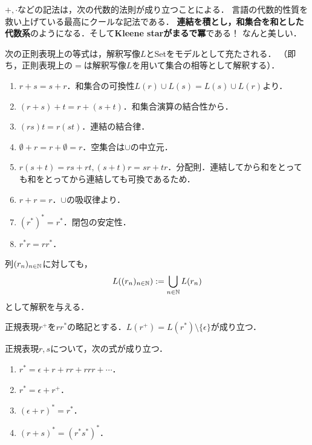 \documentclass[uplatex, dvipdfmx]{jsreport}
\begin{document}
\begin{tcolorbox}[colframe=ForestGreen, colback=ForestGreen!10!white, breakable,
    title=正則表現があからさまにするもの]
    $+,\cdot$などの記法は，次の代数的法則が成り立つことによる．
    言語の代数的性質を救い上げている最高にクールな記法である．
    \textbf{連結を積とし，和集合を和とした代数系}のようになる．そして\textbf{Kleene starがまるで冪}である！
    なんと美しい．
\end{tcolorbox}

\begin{lemma}
    次の正則表現上の等式は，解釈写像$L$とSetをモデルとして充たされる．
    （即ち，正則表現上の$=$は解釈写像$L$を用いて集合の相等として解釈する）．
    \begin{enumerate}
        \item $r+s=s+r$．和集合の可換性$L(r)\cup L(s)=L(s)\cup L(r)$より．
        \item $(r+s)+t=r+(s+t)$．和集合演算の結合性から．
        \item $(rs)t=r(st)$．連結の結合律．
        \item $\emptyset+r=r+\emptyset=r$．空集合は$\cup$の中立元．
        \item $r(s+t)=rs+rt, (s+t)r=sr+tr$．分配則．連結してから和をとっても和をとってから連結しても可換であるため．
        \item $r+r=r$．$\cup$の吸収律より．
        \item $(r^*)^*=r^*$．閉包の安定性．
        \item $r^*r=rr^*$．
    \end{enumerate}
\end{lemma}

\begin{definition}
    列$(r_n)_{n\in\mathbb{N}}$に対しても，
    \[ L((r_n)_{n\in\mathbb{N}}):=\bigcup_{n\in\mathbb{N}}L(r_n) \]
    として解釈を与える．
\end{definition}

\begin{notation}
    正規表現$r^+$を$rr^*$の略記とする．$L(r^+)=L(r^*)\setminus\{\epsilon\}$が成り立つ．
\end{notation}

\begin{lemma}[展開法則]
    正規表現$r,s$について，次の式が成り立つ．
    \begin{enumerate}
        \item $r^*=\epsilon+r+rr+rrr+\cdots$．
        \item $r^*=\epsilon+r^+$．
        \item $(\epsilon+r)^*=r^*$．
        \item $(r+s)^*=(r^*s^*)^*$．
    \end{enumerate}
\end{lemma}
\end{document}
